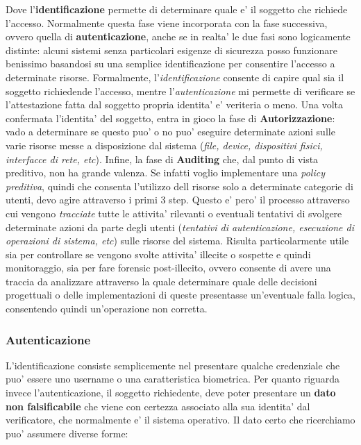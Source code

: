 Dove l'\textbf{identificazione} permette di determinare quale e' il soggetto che richiede l'accesso. Normalmente questa fase viene incorporata con la fase successiva, ovvero quella di \textbf{autenticazione}, anche se in realta' le due fasi sono logicamente distinte: alcuni sistemi senza particolari esigenze di sicurezza posso funzionare benissimo basandosi su una semplice identificazione per consentire l'accesso a determinate risorse. Formalmente, l'\emph{identificazione} consente di capire qual sia il soggetto richiedende l'accesso, mentre l'\emph{autenticazione} mi permette di verificare se l'attestazione fatta dal soggetto propria identita' e' veriteria o meno. Una volta confermata l'identita' del soggetto, entra in gioco la fase di \textbf{Autorizzazione}: vado a determinare se questo puo' o no puo' eseguire determinate azioni sulle varie risorse messe a disposizione dal sistema (\emph{file, device, dispositivi fisici, interfacce di rete, etc}). 
Infine, la fase di \textbf{Auditing} che, dal punto di vista preditivo, non ha grande valenza. Se infatti voglio implementare una \emph{policy preditiva}, quindi che consenta l'utilizzo dell risorse solo a determinate categorie di utenti, devo agire attraverso i primi 3 step. Questo e' pero' il processo attraverso cui vengono \emph{tracciate} tutte le attivita' rilevanti o eventuali tentativi di svolgere determinate azioni da parte degli utenti (\emph{tentativi di autenticazione, esecuzione di operazioni di sistema, etc}) sulle risorse del sistema. Risulta particolarmente utile sia per controllare se vengono svolte attivita' illecite o sospette e quindi monitoraggio, sia per fare forensic post-illecito, ovvero consente di avere una traccia da analizzare attraverso la quale determinare quale delle decisioni progettuali o delle implementazioni di queste presentasse un'eventuale falla logica, consentendo quindi un'operazione non corretta.

\subsubsection{Autenticazione}
L'identificazione consiste semplicemente nel presentare qualche credenziale che puo' essere uno username o una caratteristica biometrica. Per quanto riguarda invece l'autenticazione, il soggetto richiedente, deve poter presentare un \textbf{dato non falsificabile} che viene con certezza associato alla sua identita' dal verificatore, che normalmente e' il sistema operativo. 
Il dato certo che ricerchiamo puo' assumere diverse forme:

